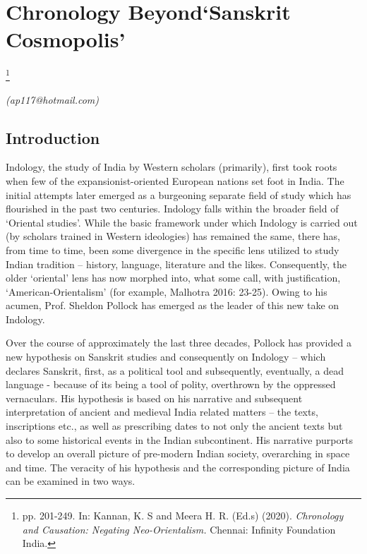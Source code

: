 
\chapter{\hspace{4cm} Chronology Beyond\hfill\break ‘Sanskrit Cosmopolis’}\label{chapter7}

\footnote{pp. 201-249. In: Kannan, K. S and Meera H. R. (Ed.s) (2020). \textit{Chronology and Causation: Negating Neo-Orientalism.} Chennai: Infinity Foundation India.}

\begin{flushright}
\textit{(ap117@hotmail.com)}
\end{flushright}

\setcounter{endnote}{0}

\section*{Introduction}

Indology, the study of India by Western scholars (primarily), first took roots when few of the expansionist-oriented European nations set foot in India. The initial attempts later emerged as a burgeoning separate field of study which has flourished in the past two centuries. Indology falls within the broader field of ‘Oriental studies’. While the basic framework under which Indology is carried out (by scholars trained in Western ideologies) has remained the same, there has, from time to time, been some divergence in the specific lens utilized to study Indian tradition – history, language, literature and the likes. Consequently, the older ‘oriental’ lens has now morphed into, what some call, with justification, ‘American-Orientalism’ (for example, Malhotra 2016: 23-25). Owing to his acumen, Prof. Sheldon Pollock has emerged as the leader of this new take on Indology.

Over the course of approximately the last three decades, Pollock has provided a new hypothesis on Sanskrit studies and consequently on Indology -- which declares Sanskrit, first, as a political tool and subsequently, eventually, a dead language - because of its being a tool of polity, overthrown by the oppressed vernaculars. His hypothesis is based on his narrative and subsequent interpretation of ancient and medieval India related matters – the texts, inscriptions etc., as well as prescribing dates to not only the ancient texts but also to some historical events in the Indian subcontinent. His narrative purports to develop an overall picture of pre-modern Indian society, overarching in space and time. The veracity of his hypothesis and the corresponding picture of India can be examined in two ways.

